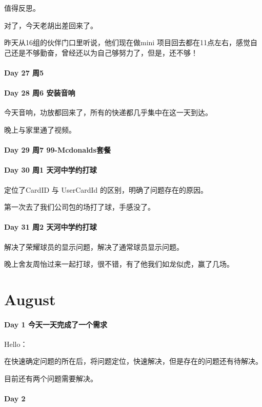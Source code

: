 \documentclass[UTF8,a4paper,8pt]{ctexart}
\begin{document}
 	 	值得反思。
 	 	
 	 	对了，今天老胡出差回来了。
 	 	
 	 	昨天从16组的伙伴门口里听说，他们现在做mini 项目回去都在11点左右，感觉自己还是不够勤奋，曾经还以为自己够努力了，但是，还不够！
 	 \paragraph{Day 27   周5   \quad     }
 	 \paragraph{Day 28   周6 安装音响  \quad     }
 	 	今天音响，功放都回来了，所有的快递都几乎集中在这一天到达。
 	 	
 	 	晚上与家里通了视频。
 	 \paragraph{Day 29   周7 99-Mcdonalds套餐  \quad     }   
 	 \paragraph{Day 30   周1 天河中学约打球  \quad     }
 	 	定位了CardID  与 UserCardId 的区别，明确了问题存在的原因。
 	 	
 	 	第一次去了我们公司包的场打了球，手感没了。
 	 	
 	 \paragraph{Day 31   周2 天河中学约打球  \quad     }
 	 	解决了荣耀球员的显示问题，解决了通常球员显示问题。
 	 	
 	 	晚上舍友周怡过来一起打球，很不错，有了他我们如龙似虎，赢了几场。
\section{August}
 	 \paragraph{Day 1    今天一天完成了一个需求   \quad     }
 	 	Hello：
 	 	
 	 	在快速确定问题的所在后，将问题定位，快速解决，但是存在的问题还有待解决。
 	 	
 	 	目前还有两个问题需要解决。
 	 	
 	 \paragraph{Day 2       \quad     }
\end{document}
